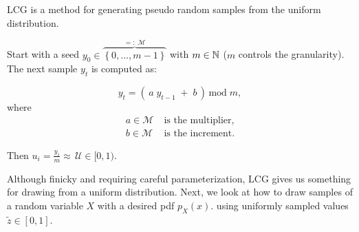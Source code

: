 \begin{frame}{\subsubsecname}

LCG is a method for generating pseudo random samples from the uniform distribution.

Start with a seed $y_0 \in \overbrace{\left\{0,\ldots,m-1\right\}}^{=:\;\mathcal{M}}$ with $m \in \mathbb{N}$ ($m$ controls the granularity). 
The next sample $y_t$ is computed as:

\begin{equation}
y_t = \left( \, a \; y_{t-1} \; + \; b \, \right) \, \text{mod} \; m,
\end{equation}
where\\[-0.7cm]
\begin{align*}
a \in \mathcal{M}&\; \text{is the multiplier,} \\
b \in \mathcal{M}&\; \text{is the increment.}
\end{align*}

Then $u_i = \frac{y_i}{m} \approx \,\mathcal{U} \in \lbrack0, 1)$.

\pause


\end{frame}

\begin{frame}

Although finicky and requiring careful parameterization, LCG gives us something for drawing from a uniform distribution. 
\svspace{5mm}
Next, we look at how to draw samples of a random variable $X$ with a desired pdf $p_X(x)$. 
using uniformly sampled values $\tilde z \in [0,1]$.

\end{frame}

